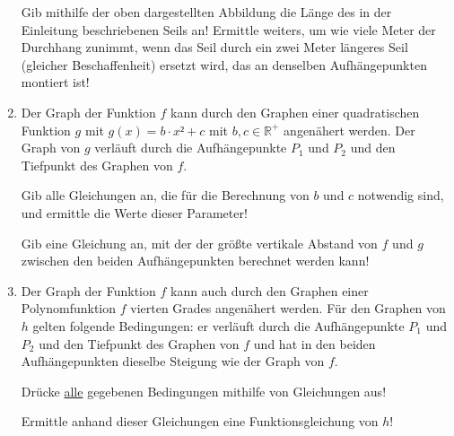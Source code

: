 \begin{langesbeispiel}
\begin{enumerate}
	Gib mithilfe der oben dargestellten Abbildung die Länge des in der Einleitung beschriebenen Seils an! Ermittle weiters, um wie viele Meter der Durchhang zunimmt, wenn das Seil durch ein zwei Meter längeres Seil (gleicher Beschaffenheit) ersetzt wird, das an denselben Aufhängepunkten montiert ist!\leer
	
	\item Der Graph der Funktion $f$ kann durch den Graphen einer quadratischen Funktion $g$ mit $g(x)=b\cdot x²+c$ mit $b,c\in\mathbb{R}^+$ angenähert werden. Der Graph von $g$ verläuft durch die Aufhängepunkte $P_1$ und $P_2$ und den Tiefpunkt des Graphen von $f$.\leer
	
	Gib alle Gleichungen an, die für die Berechnung von $b$ und $c$ notwendig sind, und ermittle die Werte dieser Parameter!\leer
	
	Gib eine Gleichung an, mit der der größte vertikale Abstand von $f$ und $g$ zwischen den beiden Aufhängepunkten berechnet werden kann!\leer
	
	\item Der Graph der Funktion $f$ kann auch durch den Graphen einer Polynomfunktion $f$ vierten Grades angenähert werden. Für den Graphen von $h$ gelten folgende Bedingungen: er verläuft durch die Aufhängepunkte $P_1$ und $P_2$ und den Tiefpunkt des Graphen von $f$ und hat in den beiden Aufhängepunkten dieselbe Steigung wie der Graph von $f$.\leer
	
	Drücke \underline{alle} gegebenen Bedingungen mithilfe von Gleichungen aus!\leer
	
	Ermittle anhand dieser Gleichungen eine Funktionsgleichung von $h$!
	
\end{enumerate}

\end{langesbeispiel}
